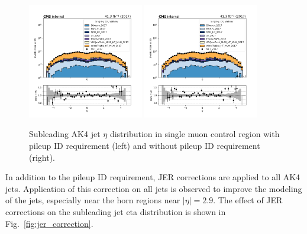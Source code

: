 \begin{figure}[htbp]
  \centering
        \includegraphics[width=0.45\textwidth]{fig/datamc/cr_1m_vbf/cr_1m_vbf_ak4_eta1_losf_2017_withpuid.png}
        \includegraphics[width=0.45\textwidth]{fig/datamc/cr_1m_vbf/cr_1m_vbf_ak4_eta1_losf_2017_withoutpuid.png}
  \caption{Subleading AK4 jet $\eta$ distribution in single muon control region with pileup ID requirement (left) 
  and without pileup ID requirement (right).}
  \label{fig:pileupid}
\end{figure}

In addition to the pileup ID requirement, JER corrections are applied to all AK4 jets. Application of this correction on all 
jets is observed to improve the modeling of the jets, especially near the horn regions near $|\eta| = 2.9$. The effect of JER 
corrections on the subleading jet eta distribution is shown in Fig.~\ref{fig:jer_correction}.


